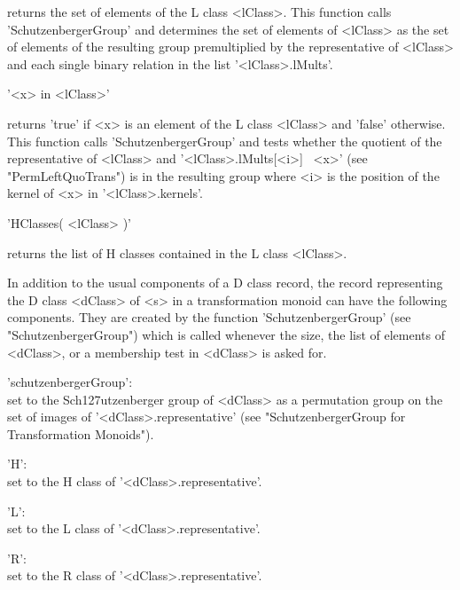returns the set of elements of the L class <lClass>.  This function calls
'SchutzenbergerGroup'  and determines the set of  elements of <lClass> as
the   set   of elements  of  the   resulting   group premultiplied by the
representative of <lClass> and each  single binary  relation in the  list
'<lClass>.lMults'.

\vspace{5mm}
'<x> in <lClass>'%
%

returns 'true' if  <x> is an element of  the L class <lClass> and 'false'
otherwise.  This function calls  'SchutzenbergerGroup' and tests  whether
the quotient of  the representative of <lClass> and '<lClass>.lMults[<i>]
\*\ <x>' (see "PermLeftQuoTrans") is in the  resulting group where <i> is
the position of the kernel of <x> in '<lClass>.kernels'.

\vspace{5mm}
'HClasses( <lClass> )'

returns the list of H classes contained in the L class <lClass>.


In  addition to the   usual components of  a D  class record,  the record
representing  the D class <dClass> of  <s> in a transformation monoid can
have  the following  components.   They   are  created by   the  function
'SchutzenbergerGroup'   (see    "SchutzenbergerGroup") which   is  called
whenever the size, the list of elements of <dClass>, or a membership test
in <dClass> is asked for.

'schutzenbergerGroup':\\
        set to   the Sch\accent127utzenberger group     of <dClass> as  a
        permutation      group  on       the  set     of    images     of
        '<dClass>.representative'    (see   "SchutzenbergerGroup      for
        Transformation Monoids").
        
'H':\\
        set to the H class of '<dClass>.representative'.

'L':\\
        set to the L class of '<dClass>.representative'.

'R':\\
        set to the R class of '<dClass>.representative'.
        
